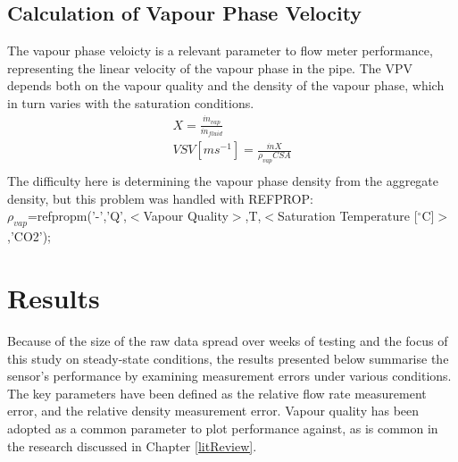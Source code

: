 \documentclass{report}
\begin{document}
\section{Calculation of Vapour Phase Velocity}
The vapour phase veloicty is a relevant parameter to flow meter performance, representing the linear velocity of the vapour phase in the pipe. The VPV depends both on the vapour quality  and the density of the vapour phase, which in turn varies with the saturation conditions.\\
\begin{eqnarray}
X=\frac{\dot{m}_{vap}}{\dot{m}_{fluid}}\\
VSV[ms^{-1}]=\frac{\dot{m}X}{\rho_{vap}CSA} \\
\end{eqnarray}
The difficulty here is determining the vapour phase density from the aggregate density, but this problem was handled with REFPROP:\\
$\rho_{vap}$=refpropm('-','Q',$<$Vapour Quality$>$,T,$<$Saturation Temperature [$^\circ$C]$>$,'CO2');

\chapter{Results} \label{results}
Because of the size of the raw data spread over weeks of testing and the focus of this study on steady-state conditions, the results presented below summarise the sensor's performance by examining measurement errors under various conditions. The key parameters have been defined as the relative flow rate measurement error, and the relative density measurement error. Vapour quality has been adopted as a common parameter to plot performance against, as is common in the research discussed in Chapter \ref{litReview}.
\end{document}
